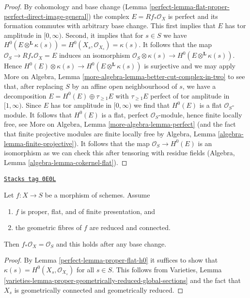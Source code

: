 \begin{proof}

By cohomology and base change
(Lemma \ref{perfect-lemma-flat-proper-perfect-direct-image-general})
the complex $E = Rf_*\mathcal{O}_X$
is perfect and its formation commutes with arbitrary base change.
This first implies that $E$ has tor amplitude in $[0, \infty)$.
Second, it implies that for $s \in S$ we have
$H^0(E \otimes^\mathbf{L} \kappa(s)) =
H^0(X_s, \mathcal{O}_{X_s}) = \kappa(s)$.
It follows that the map $\mathcal{O}_S \to Rf_*\mathcal{O}_X = E$
induces an isomorphism
$\mathcal{O}_S \otimes \kappa(s) \to H^0(E \otimes^\mathbf{L} \kappa(s))$.
Hence $H^0(E) \otimes \kappa(s) \to H^0(E \otimes^\mathbf{L} \kappa(s))$
is surjective and we may apply
More on Algebra, Lemma \ref{more-algebra-lemma-better-cut-complex-in-two}
to see that, after replacing $S$ by an affine open neighbourhood of $s$,
we have a decomposition $E = H^0(E) \oplus \tau_{\geq 1}E$
with $\tau_{\geq 1}E$ perfect of tor amplitude in $[1, \infty)$.
Since $E$ has tor amplitude in $[0, \infty)$ we find that
$H^0(E)$ is a flat $\mathcal{O}_S$-module.
It follows that $H^0(E)$ is a flat, perfect $\mathcal{O}_S$-module,
hence finite locally free, see
More on Algebra, Lemma \ref{more-algebra-lemma-perfect}
(and the fact that finite projective modules are finite locally free by
Algebra, Lemma \ref{algebra-lemma-finite-projective}).
It follows that the map $\mathcal{O}_S \to H^0(E)$ is
an isomorphism as we can check this after tensoring with
residue fields (Algebra, Lemma \ref{algebra-lemma-cokernel-flat}).
\end{proof}

\begin{lemma}
\label{perfect-lemma-proper-flat-geom-red-connected}
\href{https://stacks.math.columbia.edu/tag/0E0L}{\texttt{Stacks tag 0E0L}}

Let $f : X \to S$ be a morphism of schemes. Assume
\begin{enumerate}
\item $f$ is proper, flat, and of finite presentation, and
\item the geometric fibres of $f$ are reduced and connected.
\end{enumerate}
Then $f_*\mathcal{O}_X = \mathcal{O}_S$ and this holds
after any base change.
\end{lemma}

\begin{proof}

By Lemma \ref{perfect-lemma-proper-flat-h0}
it suffices to show that $\kappa(s) = H^0(X_s, \mathcal{O}_{X_s})$
for all $s \in S$. This follows from
Varieties, Lemma
\ref{varieties-lemma-proper-geometrically-reduced-global-sections}
and the fact that $X_s$ is geometrically connected and geometrically reduced.
\end{proof}

